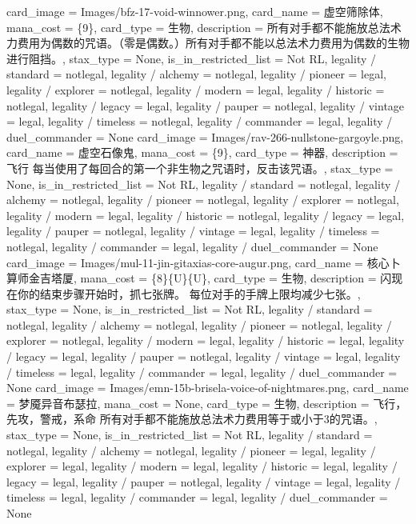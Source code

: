 \documentclass[lang = cn, color = black, 10pt]{AllThatStax}
\begin{document}
\card
{
	card_image = Images/bfz-17-void-winnower.png,
	card_name = 虚空筛除体,
	mana_cost = \{9\},
	card_type = 生物,
	description = 所有对手都不能施放总法术力费用为偶数的咒语。（零是偶数。）所有对手都不能以总法术力费用为偶数的生物进行阻挡。,
	stax_type = None,
	is_in_restricted_list = Not RL,
	legality / standard = notlegal,
	legality / alchemy = notlegal,
	legality / pioneer = legal,
	legality / explorer = notlegal,
	legality / modern = legal,
	legality / historic = notlegal,
	legality / legacy = legal,
	legality / pauper = notlegal,
	legality / vintage = legal,
	legality / timeless = notlegal,
	legality / commander = legal,
	legality / duel_commander = None
}
\card
{
	card_image = Images/rav-266-nullstone-gargoyle.png,
	card_name = 虚空石像鬼,
	mana_cost = \{9\},
	card_type = 神器,
	description = 飞行
	每当使用了每回合的第一个非生物之咒语时，反击该咒语。,
	stax_type = None,
	is_in_restricted_list = Not RL,
	legality / standard = notlegal,
	legality / alchemy = notlegal,
	legality / pioneer = notlegal,
	legality / explorer = notlegal,
	legality / modern = legal,
	legality / historic = notlegal,
	legality / legacy = legal,
	legality / pauper = notlegal,
	legality / vintage = legal,
	legality / timeless = notlegal,
	legality / commander = legal,
	legality / duel_commander = None
}
\card
{
	card_image = Images/mul-11-jin-gitaxias-core-augur.png,
	card_name = 核心卜算师金吉塔厦,
	mana_cost = \{8\}\{U\}\{U\},
	card_type = 生物,
	description = 闪现
	在你的结束步骤开始时，抓七张牌。
	每位对手的手牌上限均减少七张。,
	stax_type = None,
	is_in_restricted_list = Not RL,
	legality / standard = notlegal,
	legality / alchemy = notlegal,
	legality / pioneer = notlegal,
	legality / explorer = notlegal,
	legality / modern = legal,
	legality / historic = legal,
	legality / legacy = legal,
	legality / pauper = notlegal,
	legality / vintage = legal,
	legality / timeless = legal,
	legality / commander = legal,
	legality / duel_commander = None
}
\card
{
	card_image = Images/emn-15b-brisela-voice-of-nightmares.png,
	card_name = 梦魇异音布瑟拉,
	mana_cost = None,
	card_type = 生物,
	description = 飞行，先攻，警戒，系命
	所有对手都不能施放总法术力费用等于或小于3的咒语。,
	stax_type = None,
	is_in_restricted_list = Not RL,
	legality / standard = notlegal,
	legality / alchemy = notlegal,
	legality / pioneer = legal,
	legality / explorer = legal,
	legality / modern = legal,
	legality / historic = legal,
	legality / legacy = legal,
	legality / pauper = notlegal,
	legality / vintage = legal,
	legality / timeless = legal,
	legality / commander = legal,
	legality / duel_commander = None
}
\end{document}
